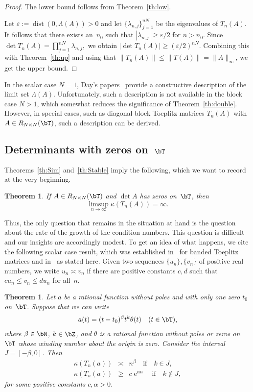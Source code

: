 \documentclass[addpoints,12pt,letter]{article}
\DeclareMathOperator{\dist}{dist}
\DeclareMathOperator{\e}{e}
\newcommand{\al}{\alpha}
\newcommand{\be}{\beta}
\newcommand{\eps}{\varepsilon}
\newcommand{\ka}{\kappa}
\newcommand{\la}{\lambda}
\newcommand{\La}{\Lambda}
\newcommand{\nf}{\infty}
\newcommand{\tht}{\theta}
\renewcommand{\ge}{\geqslant}
\renewcommand{\le}{\leqslant}
\numberwithin{equation}{section}
\newtheorem{theorem}[lemma]{Theorem}
\theoremstyle{definition}
\begin{document}
\begin{proof}
The lower bound follows from Theorem~\ref{th:low}.

Let $\eps:=\dist(0,\La(A))>0$ and let $\{\la_{n,j}\}_{j=1}^{nN}$ be the eigenvalues of $T_{n}(A)$.
It follows that there exists an~$n_{0}$ such that $|\la_{n,j}|\ge\eps/2$ for $n>n_{0}$.
Since $\det T_{n}(A)=\prod_{j=1}^{nN}\la_{n,j},$ we obtain $|\det T_{n}(A)|\ge({\eps}/{2})^{nN}$.
Combining this with Theorem~\ref{th:up} and using that $\|T_{n}(A)\|\le\|T(A)\|=\|A\|_{\nf}$, we get the upper bound.
\end{proof}

In the scalar case $N=1$, Day's papers~\cite{Da75a,Da75b} provide a constructive description of the limit set $\La(A)$.
Unfortunately, such a description is not available in the block case $N>1$, which somewhat reduces the significance of Theorem~\ref{th:double}.
However, in special cases, such as diagonal block Toeplitz matrices $T_{n}(A)$ with $A\in R_{N\times N}(\bT)$, such a description can be derived.

\subsection{Determinants with zeros on~$\bT$}\label{ssec:main2}

Theorems~\ref{th:Sim} and~\ref{th:Stable} imply the following, which we want to record at the very beginning.

\begin{theorem}\label{th:limsup}
If $A\in R_{N\times N}(\bT)$ and $\det A$ has zeros on~$\bT$, then
\[
\limsup_{n\to\nf}\ka(T_{n}(A))=\nf.
\]
\end{theorem}

Thus, the only question that remains in the situation at hand is the question about the rate of the growth of the condition numbers.
This question is difficult and our insights are accordingly modest.
To get an idea of what happens, we cite the following scalar case result, which was established in~\cite{AmoBru96} for banded Toeplitz matrices and in~\cite{BoGr99} as stated here.
Given two sequences $\{u_{n}\}, \{v_{n}\}$ of positive real numbers, we write $u_{n} \asymp v_{n}$ if there are positive constants $c,d$ such that $cu_{n}\le v_{n}\le du_{n}$ for all~$n$.

\begin{theorem}\label{th:RFact}
Let $a$ be a rational function without poles and with only one zero $t_{0}$ on~$\bT$.
Suppose that we can write
\[
a(t)=(t-t_{0})^{\be}t^{k}\tht(t)\quad(t\in\bT),
\]
where $\be\in\bN$, $k\in\bZ$, and $\tht$ is a rational function without poles or zeros on~$\bT$ whose winding number about the origin is zero.
Consider the interval $J=[-\be,0]$.
Then
\begin{eqnarray*}
\ka(T_{n}(a))&\asymp&n^{\be}\quad\mbox{if}\quad k\in J,\\
\ka(T_{n}(a))&\ge&c\e^{\al n}\quad\mbox{if}\quad k\notin J,
\end{eqnarray*}
for some positive constants $c,\al>0$.
\end{theorem}
\end{document}
